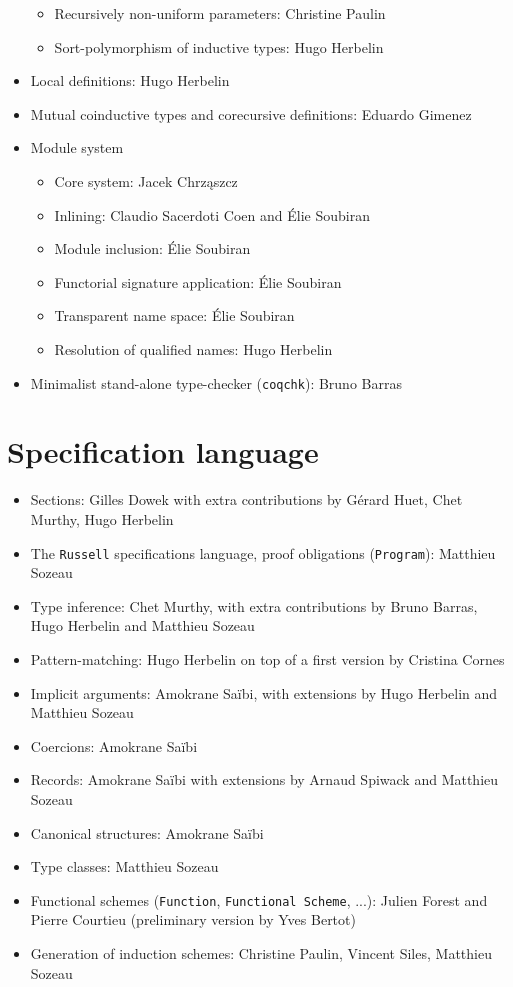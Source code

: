 \documentclass{article}
\begin{document}
\begin{itemize}
\begin{itemize}
  \item Recursively non-uniform parameters: Christine Paulin
  \item Sort-polymorphism of inductive types: Hugo Herbelin
  \end{itemize}
\item Local definitions: Hugo Herbelin
\item Mutual coinductive types and corecursive definitions: Eduardo Gimenez
\item Module system
  \begin{itemize}
  \item Core system: Jacek Chrz\k{a}szcz
  \item Inlining: Claudio Sacerdoti Coen and Élie Soubiran
  \item Module inclusion: Élie Soubiran
  \item Functorial signature application: Élie Soubiran
  \item Transparent name space: Élie Soubiran
  \item Resolution of qualified names: Hugo Herbelin
  \end{itemize}
\item Minimalist stand-alone type-checker (\texttt{coqchk}): Bruno Barras
\end{itemize}

\section{Specification language}

\begin{itemize}
\item Sections: Gilles Dowek with extra contributions by Gérard
  Huet, Chet Murthy, Hugo Herbelin
\item The \texttt{Russell} specifications language, proof obligations (\texttt{Program}): Matthieu Sozeau
\item Type inference: Chet Murthy, with extra contributions by Bruno
  Barras, Hugo Herbelin and Matthieu Sozeau
\item Pattern-matching: Hugo Herbelin on top of a first version by
  Cristina Cornes
\item Implicit arguments: Amokrane Saïbi, with extensions by Hugo
  Herbelin and Matthieu Sozeau
\item Coercions: Amokrane Saïbi
\item Records: Amokrane Saïbi with extensions by Arnaud Spiwack and
  Matthieu Sozeau
\item Canonical structures: Amokrane Saïbi
\item Type classes: Matthieu Sozeau
\item Functional schemes (\texttt{Function}, \texttt{Functional Scheme}, ...): Julien Forest and Pierre Courtieu (preliminary version by Yves Bertot)
\item Generation of induction schemes: Christine Paulin, Vincent
  Siles, Matthieu Sozeau
 \end{itemize}
\end{document}
